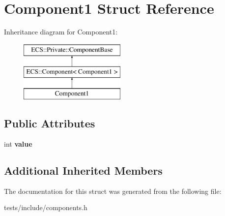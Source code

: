 \hypertarget{struct_component1}{\section{Component1 Struct Reference}
\label{struct_component1}
}
Inheritance diagram for Component1\-:\begin{figure}[H]
\begin{center}
\leavevmode
\includegraphics[height=3.000000cm]{struct_component1}
\end{center}
\end{figure}
\subsection*{Public Attributes}
\begin{DoxyCompactItemize}
\item 
\hypertarget{struct_component1_a269a044b8706f918d49731cddb0544b9}{int {\bfseries value}}\label{struct_component1_a269a044b8706f918d49731cddb0544b9}

\end{DoxyCompactItemize}
\subsection*{Additional Inherited Members}


The documentation for this struct was generated from the following file\-:\begin{DoxyCompactItemize}
\item 
tests/include/components.\-h\end{DoxyCompactItemize}
